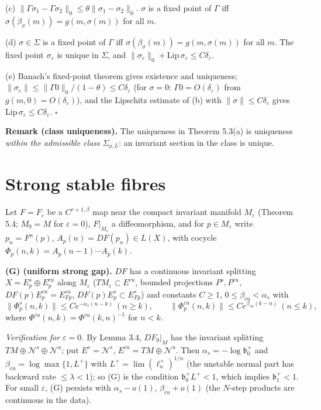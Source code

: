 \documentclass[11pt,a4paper]{article}
\theoremstyle{plain}
\theoremstyle{definition}
\theoremstyle{remark}
\numberwithin{equation}{section}
\numberwithin{figure}{section}
\begin{document}
(c) $\|\Gamma\sigma_1-\Gamma\sigma_2\|_0\le\theta\|\sigma_1-\sigma_2\|_0$. $\sigma$ is a fixed point of $\Gamma$ iff $\sigma(\beta_\sigma(m))=g(m,\sigma(m))$ for all $m$.

(d) $\sigma\in\Sigma$ is a fixed point of $\Gamma$ iff $\sigma(\beta_\sigma(m))=g(m,\sigma(m))$ for all $m$. The fixed point $\sigma_\varepsilon$ is unique in $\Sigma$, and $\|\sigma_\varepsilon\|_0+\mathrm{Lip}\,\sigma_\varepsilon\le C\delta_\varepsilon$.

(e) Banach's fixed-point theorem gives existence and uniqueness; $\|\sigma_\varepsilon\|\le\|\Gamma0\|_0/(1-\theta)\le C\delta_\varepsilon$ (for $\sigma=0$: $\Gamma0=O(\delta_\varepsilon)$ from $g(m,0)=O(\delta_\varepsilon)$), and the Lipschitz estimate of (b) with $\|\sigma\|\le C\delta_\varepsilon$ gives $\mathrm{Lip}\,\sigma_\varepsilon\le C\delta_\varepsilon$. $\square$

\textbf{Remark (class uniqueness).} The uniqueness in Theorem 5.3(a) is uniqueness \textit{within the admissible class} $\Sigma_{\rho,L}$: an invariant section in the class is unique.

\section{Strong stable fibres}

Let $F=F_\varepsilon$ be a $C^{r+1,\beta}$ map near the compact invariant manifold $M_\varepsilon$ (Theorem 5.4; $M_0=M$ for $\varepsilon=0$), $F|_{M_\varepsilon}$ a diffeomorphism, and for $p\in M_\varepsilon$ write $p_n=F^n(p)$, $A_p(n)=DF(p_n)\in L(X)$, with cocycle $\Phi_p(n,k)=A_p(n-1)\cdots A_p(k)$.

\textbf{(G) (uniform strong gap).} $DF$ has a continuous invariant splitting $X=E^s_p\oplus E^{cu}_p$ along $M_\varepsilon$ ($TM_\varepsilon\subset E^{cu}$, bounded projections $P^s,P^{cu}$, $DF(p)E^{cu}_p=E^{cu}_{Fp}$, $DF(p)E^s_p\subset E^s_{Fp}$) and constants $C\ge1$, $0\le\beta_{cu}<\alpha_s$ with
\[
\|\Phi^s_p(n,k)\|\le Ce^{-\alpha_s(n-k)}\ (n\ge k),\qquad\|\Phi^{cu}_p(n,k)\|\le Ce^{\beta_{cu}(k-n)}\ (n\le k),
\]
where $\Phi^{cu}(n,k)=\Phi^{cu}(k,n)^{-1}$ for $n<k$.

\textit{Verification for $\varepsilon=0$.} By Lemma 3.4, $DF_0|_M$ has the invariant splitting $TM\oplus\mathcal N^s\oplus\mathcal N^u$; put $E^s=\mathcal N^s$, $E^{cu}=TM\oplus\mathcal N^u$. Then $\alpha_s=-\log\mathfrak b_0^+$ and $\beta_{cu}=\log\max\{1,L^+\}$ with $L^+=\lim(\ell_n^+)^{1/n}$ (the unstable normal part has backward rate $\le\lambda<1$); so (G) is the condition $\mathfrak b_0^+L^+<1$, which implies $\mathfrak b_1^+<1$. For small $\varepsilon$, (G) persists with $\alpha_s-o(1)$, $\beta_{cu}+o(1)$ (the $N$-step products are continuous in the data).
\end{document}
